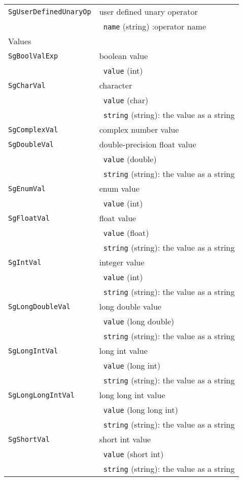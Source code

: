 \begin{longtable}[l]{l|p{10cm}}
 \texttt{SgUserDefinedUnaryOp} & user defined unary operator\\
 & ~\texttt{name} (string) :operator name \\
 \hline
 \multicolumn{2}{l}{Values}\\
 \hline
 \texttt{SgBoolValExp}& boolean value \\
 & ~\texttt{value} (int) \\
 \texttt{SgCharVal}& character \\
 & ~\texttt{value} (char) \\
 & ~\texttt{string} (string): the value as a string \\
 \texttt{SgComplexVal}& complex number value \\
 \texttt{SgDoubleVal}& double-precision float value \\
 & ~\texttt{value} (double) \\
 & ~\texttt{string} (string): the value as a string \\
 \texttt{SgEnumVal}& enum value \\
 & ~\texttt{value} (int) \\
 \texttt{SgFloatVal}& float value \\
 & ~\texttt{value} (float) \\
 & ~\texttt{string} (string): the value as a string \\
 \texttt{SgIntVal}& integer value\\
 & ~\texttt{value} (int) \\
 & ~\texttt{string} (string): the value as a string \\
 \texttt{SgLongDoubleVal}& long double value\\
 & ~\texttt{value} (long double) \\
 & ~\texttt{string} (string): the value as a string \\
 \texttt{SgLongIntVal}& long int value \\
 & ~\texttt{value} (long int) \\
 & ~\texttt{string} (string): the value as a string \\
 \texttt{SgLongLongIntVal}& long long int value\\
 & ~\texttt{value} (long long int) \\
 & ~\texttt{string} (string): the value as a string \\
 \texttt{SgShortVal}& short int value\\
 & ~\texttt{value} (short int) \\
 & ~\texttt{string} (string): the value as a string \\

\end{longtable}

